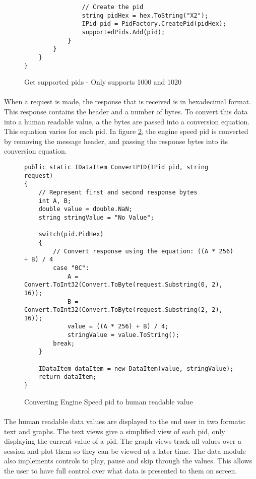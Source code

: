 {\begin{figure}[h]
\begin{lstlisting}
				// Create the pid
				string pidHex = hex.ToString("X2");
				IPid pid = PidFactory.CreatePid(pidHex);
				supportedPids.Add(pid);
			}
		}
	}
}
			\end{lstlisting}
			\caption{Get supported pids - Only supports 1000 and 1020}
			\label{code:SupportedPids}
		\end{figure}
		
		\paragraph{}{
		When a request is made, the response that is received is in hexadecimal format. This response contains the header and a number of bytes. To convert this data into a human readable value, a the bytes are passed into a conversion equation. This equation varies for each pid. In figure \ref{code:ConvertingPids}, the engine speed pid is converted by removing the message header, and passing the response bytes into its conversion equation.
		}
		
		\begin{figure}[h]
			\begin{lstlisting}
public static IDataItem ConvertPID(IPid pid, string request)
{
	// Represent first and second response bytes
	int A, B;
	double value = double.NaN;
	string stringValue = "No Value";
	
	switch(pid.PidHex)
	{
		// Convert response using the equation: ((A * 256) + B) / 4
		case "0C":    
			A = Convert.ToInt32(Convert.ToByte(request.Substring(0, 2), 16));
			B = Convert.ToInt32(Convert.ToByte(request.Substring(2, 2), 16));
			value = ((A * 256) + B) / 4;
			stringValue = value.ToString();
		break;
	}

	IDataItem dataItem = new DataItem(value, stringValue);	
    return dataItem;
}
			\end{lstlisting}
			\caption{Converting Engine Speed pid to human readable value}
			\label{code:ConvertingPids}
		\end{figure}		
			
		\paragraph{}{
		The human readable data values are displayed to the end user in two formats: text and graphs. The text views give a simplified view of each pid, only displaying the current value of a pid. The graph views track all values over a session and plot them so they can be viewed at a later time. The data module also implements controls to play, pause and skip through the values. This allows the user to have full control over what data is presented to them on screen. 
		}
		
}
